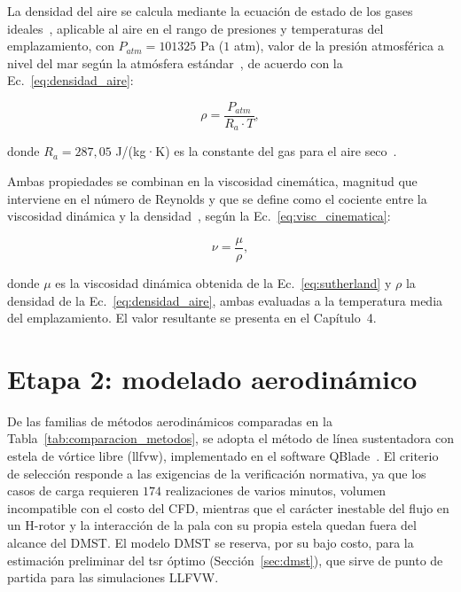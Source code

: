La densidad del aire se calcula mediante la ecuación de estado de los gases ideales~\parencite{Anderson2016}, aplicable al aire en el rango de presiones y temperaturas del emplazamiento, con $P_{atm} = 101325$ Pa ($1$ atm), valor de la presión atmosférica a nivel del mar según la atmósfera estándar~\parencite{Anderson2016}, de acuerdo con la Ec.~\ref{eq:densidad_aire}:

\begin{equation}
    \rho = \frac{P_{atm}}{R_a \cdot T},
    \label{eq:densidad_aire}
\end{equation}

donde $R_a = 287{,}05$ J/(kg·K) es la constante del gas para el aire seco~\parencite{Anderson2016}.

Ambas propiedades se combinan en la viscosidad cinemática, magnitud que interviene en el número de Reynolds y que se define como el cociente entre la viscosidad dinámica y la densidad~\parencite{White2006}, según la Ec.~\ref{eq:visc_cinematica}:

\begin{equation}
    \nu = \frac{\mu}{\rho},
    \label{eq:visc_cinematica}
\end{equation}

donde $\mu$ es la viscosidad dinámica obtenida de la Ec.~\ref{eq:sutherland} y $\rho$ la densidad de la Ec.~\ref{eq:densidad_aire}, ambas evaluadas a la temperatura media del emplazamiento. El valor resultante se presenta en el Capítulo~4.


\section{Etapa 2: modelado aerodinámico}

De las familias de métodos aerodinámicos comparadas en la Tabla~\ref{tab:comparacion_metodos}, se adopta el método de línea sustentadora con estela de vórtice libre (\gls{llfvw}), implementado en el software QBlade~\parencite{marten2019qblade}. El criterio de selección responde a las exigencias de la verificación normativa, ya que los casos de carga requieren $174$ realizaciones de varios minutos, volumen incompatible con el costo del CFD, mientras que el carácter inestable del flujo en un H-rotor y la interacción de la pala con su propia estela quedan fuera del alcance del DMST. El modelo DMST se reserva, por su bajo costo, para la estimación preliminar del \gls{tsr} óptimo (Sección~\ref{sec:dmst}), que sirve de punto de partida para las simulaciones LLFVW.

